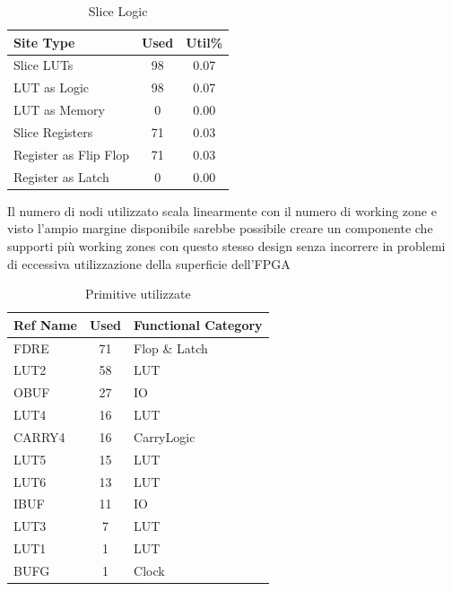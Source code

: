 \documentclass[a4paper]{article}
\begin{document}
\hspace{8em}
\begin{table}[H]
  \centering
  \begin{tabular}{|p{3.5cm}|c|c|}
    \hline
    \bf{Site Type}        & \bf{Used} & \bf{Util\%} \\
    \hline
    Slice LUTs            & 98        & 0.07        \\
    \hline
    LUT as Logic          & 98        & 0.07        \\
    \hline
    LUT as Memory         & 0         & 0.00        \\
    \hline
    Slice Registers       & 71        & 0.03        \\
    \hline
    Register as Flip Flop & 71        & 0.03        \\
    \hline
    Register as Latch     & 0         & 0.00        \\
    \hline
  \end{tabular}
  \caption{Slice Logic}
\end{table}

\hspace{8em}

Il numero di nodi utilizzato scala linearmente con il numero di working zone e visto l'ampio margine disponibile sarebbe possibile creare un componente che supporti più working zones con questo stesso design senza incorrere in problemi di eccessiva utilizzazione della superficie dell'FPGA

\hspace{8em}
\begin{table}[H]
  \centering
  \begin{tabular}{|p{2cm}|c|p{3.70cm}|}
    \hline
    \bf{Ref Name} & \bf{Used} & \bf{Functional Category} \\
    \hline
    FDRE          & 71        & Flop \& Latch            \\
    \hline
    LUT2          & 58        & LUT                      \\
    \hline
    OBUF          & 27        & IO                       \\
    \hline
    LUT4          & 16        & LUT                      \\
    \hline
    CARRY4        & 16        & CarryLogic               \\
    \hline
    LUT5          & 15        & LUT                      \\
    \hline
    LUT6          & 13        & LUT                      \\
    \hline
    IBUF          & 11        & IO                       \\
    \hline
    LUT3          & 7         & LUT                      \\
    \hline
    LUT1          & 1         & LUT                      \\
    \hline
    BUFG          & 1         & Clock                    \\
    \hline
  \end{tabular}
  \caption{Primitive utilizzate}
\end{table}
\end{document}
